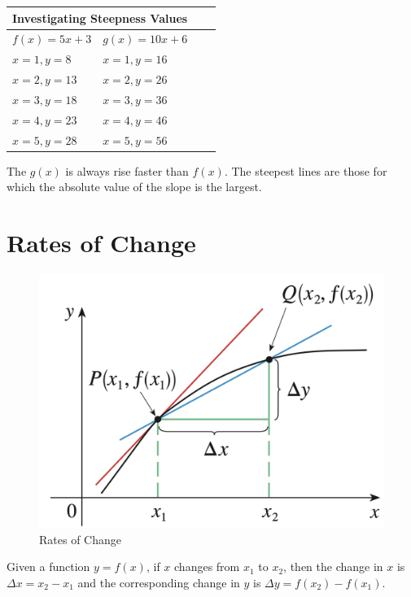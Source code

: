 \begin{center}
	\begin{tabular}{ |p{3cm}||p{3cm}|p{3cm}|p{3cm}|}
 		\hline
 		\multicolumn{2}{|c|}{Investigating Steepness Values} \\
 		\hline
 		$f(x) = 5x + 3$ & $g(x) = 10x + 6$\\
 		\hline
 		$x=1, y=8$  & $x=1, y=16$\\
 		$x=2, y=13$ & $x=2, y=26$\\
 		$x=3, y=18$ & $x=3, y=36$\\
 		$x=4, y=23$ & $x=4, y=46$ \\
 		$x=5, y=28$ & $x=5, y=56$\\
 		\hline
	\end{tabular}	
\end{center}

The $g(x)$ is always rise faster than $f(x)$. The steepest lines are those for which the absolute value of the slope is the largest.

\section{Rates of Change} 
\begin{figure}[h]
    \centering
    \includegraphics[scale=0.3]{chapter001/figures/fig004}
    \caption{Rates of Change}
    \label{fig:Fig4}
\end{figure}

\begin{flushleft}
\cite{calculus} Given a function $y=f(x)$, if $x$ changes from $x_1$ to $x_2$, then the change in $x$ is $\Delta x = x_2 - x_1$ and the corresponding change in $y$ is $\Delta y = f(x_2) - f(x_1)$.
\end{flushleft}

